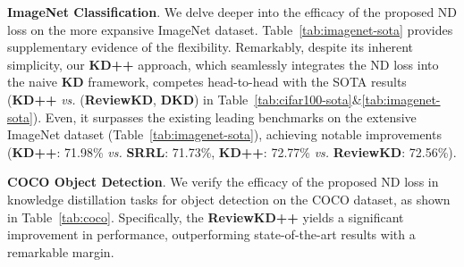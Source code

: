 \documentclass{article}
\begin{document}
\begin{table}[t]
    \centering
    \caption{\small Benchmarking results on the ImageNet dataset. Methods are reported with top-1 accuracy (\%). ``T  S'' marks the architectures of {\tt teacher} and {\tt student}, short for knowledge distillation from the former to the latter.
    R\{18,34,50\} are the ResNet18, ResNet34, and ResNet50, respectively. MV1 means MobileNet-V1.
    Again, additionally using our ND loss, methods such as KD, ReviewKD, and DKD obtain better performance than their counterparts, achieving the state-of-the-art performance on this dataset.
    }
    \vspace{1mm}
        \renewcommand{\arraystretch}{1.2}
        \setlength\tabcolsep{1.5pt}
\label{tab:imagenet-sota}
\end{table} 
\textbf{ImageNet Classification}. We delve deeper into the efficacy of the proposed ND loss on the more expansive ImageNet dataset. Table~\ref{tab:imagenet-sota} provides supplementary evidence of the flexibility. Remarkably, despite its inherent simplicity, our \textbf{KD++} approach, which seamlessly integrates the ND loss into the naive \textbf{KD} framework, competes head-to-head with the SOTA results (\textbf{KD++} \textit{vs.} (\textbf{ReviewKD}, \textbf{DKD}) in Table~\ref{tab:cifar100-sota}\&\ref{tab:imagenet-sota}). Even, it surpasses the existing leading benchmarks on the extensive ImageNet dataset (Table~\ref{tab:imagenet-sota}), achieving notable improvements (\textbf{KD++}: 71.98\% \textit{vs.} \textbf{SRRL}: 71.73\%, \textbf{KD++}: 72.77\% \textit{vs.} \textbf{ReviewKD}: 72.56\%).


\textbf{COCO Object Detection}. We verify the efficacy of the proposed ND loss in knowledge distillation tasks for object detection on the COCO dataset, as shown in Table~\ref{tab:coco}. Specifically, the \textbf{ReviewKD++} yields a significant improvement in performance, outperforming state-of-the-art results with a remarkable margin. 
\end{document}
